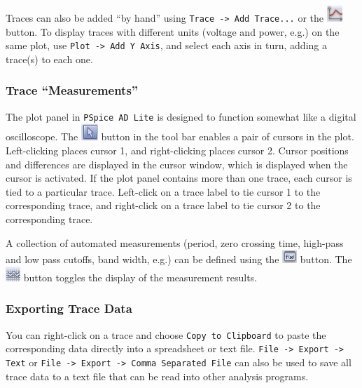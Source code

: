 \documentclass[11pt]{article}
\begin{document}
Traces can also be added ``by hand'' using
\texttt{Trace -> Add Trace...} or the
\includegraphics{PSpiceAD_AddTrace.png} button. To display traces with
different units (voltage and power, e.g.) on the same plot, use
\texttt{Plot -> Add Y Axis}, and select each axis in turn, adding a
trace(s) to each one.

\subsubsection*{Trace ``Measurements''}

The plot panel in \texttt{PSpice AD Lite} is designed to function
somewhat like a digital oscilloscope. The
\includegraphics{PSpiceAD_Cursor.png} button in the  tool bar enables
a pair of cursors in the plot. Left-clicking places cursor 1, and
right-clicking places cursor 2. Cursor positions and differences are
displayed in the cursor window, which is displayed when the cursor is
activated. If the plot panel contains more than one trace, each cursor
is tied to a particular trace. Left-click on a trace label to tie
cursor 1 to the corresponding trace, and right-click on a trace label
to tie cursor 2 to the corresponding trace.

A collection of automated measurements (period, zero crossing time,
high-pass and low pass cutoffs, band width, e.g.) can be defined using
the \includegraphics{PSpiceAD_DefineMeasurement.png} button. The 
\includegraphics{PSpiceAD_ToggleMeasurement.png} button toggles the
display of the measurement results.

\subsubsection*{Exporting Trace Data}

You can right-click on a trace and choose \texttt{Copy to Clipboard}
to paste the corresponding data directly into a spreadsheet or text
file. \texttt{File -> Export -> Text} or
\texttt{File -> Export -> Comma Separated File} can also be used to
save all trace data to a text file that can be read into other
analysis programs.
\end{document}
